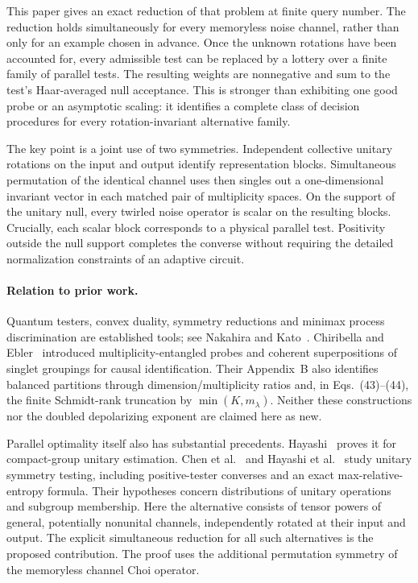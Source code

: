 \documentclass[11pt,a4paper]{article}
\theoremstyle{remark}\newtheorem{remark}[theorem]{Remark}
\begin{document}
This paper gives an exact reduction of that problem at finite query number. The reduction holds simultaneously for every memoryless noise channel, rather than only for an example chosen in advance. Once the unknown rotations have been accounted for, every admissible test can be replaced by a lottery over a finite family of parallel tests. The resulting weights are nonnegative and sum to the test's Haar-averaged null acceptance. This is stronger than exhibiting one good probe or an asymptotic scaling: it identifies a complete class of decision procedures for every rotation-invariant alternative family.

The key point is a joint use of two symmetries. Independent collective unitary rotations on the input and output identify representation blocks. Simultaneous permutation of the identical channel uses then singles out a one-dimensional invariant vector in each matched pair of multiplicity spaces. On the support of the unitary null, every twirled noise operator is scalar on the resulting blocks. Crucially, each scalar block corresponds to a physical parallel test. Positivity outside the null support completes the converse without requiring the detailed normalization constraints of an adaptive circuit.

\paragraph{Relation to prior work.}
Quantum testers, convex duality, symmetry reductions and minimax process discrimination are established tools; see Nakahira and Kato~\cite{nakahira}. Chiribella and Ebler~\cite{chiribella} introduced multiplicity-entangled probes and coherent superpositions of singlet groupings for causal identification. Their Appendix~B also identifies balanced partitions through dimension/multiplicity ratios and, in Eqs.~(43)--(44), the finite Schmidt-rank truncation by $\min(K,m_\lambda)$. Neither these constructions nor the doubled depolarizing exponent are claimed here as new.

Parallel optimality itself also has substantial precedents. Hayashi~\cite{hayashi} proves it for compact-group unitary estimation. Chen et al.~\cite{chen_symmetry} and Hayashi et al.~\cite{hayashi_symmetry} study unitary symmetry testing, including positive-tester converses and an exact max-relative-entropy formula. Their hypotheses concern distributions of unitary operations and subgroup membership. Here the alternative consists of tensor powers of general, potentially nonunital channels, independently rotated at their input and output. The explicit simultaneous reduction for all such alternatives is the proposed contribution. The proof uses the additional permutation symmetry of the memoryless channel Choi operator.
\end{document}
